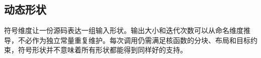 \subsection*{动态形状}

符号维度让一份源码表达一组输入形状。输出大小和迭代次数可以从命名维度推导，不必作为独立常量重复维护。每次调用仍需满足核函数的分块、布局和目标约束，符号形状并不意味着所有形状都能得到同样好的支持。
